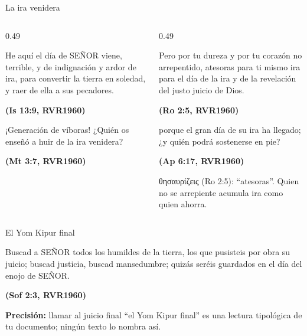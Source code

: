 \documentclass[hyperref={bookmarks=false},aspectratio=169]{beamer}
\newcommand{\grc}[1]{\foreignlanguage{ancientgreek}{#1}}
\newcommand{\SENOR}{S{\fontsize{0.78em}{1em}\selectfont EÑOR}}
\newcommand{\fuente}[1]{\par\hfill{\upshape\bfseries\footnotesize\textcolor{azul}{#1}}}
\newcommand{\precision}[1]{{\footnotesize\color{gris}\textbf{Precisión:} #1}}
\begin{document}
\begin{frame}{La ira venidera}
\begin{columns}[t,onlytextwidth]
\begin{column}{0.49\textwidth}
\begin{cita}He aquí el día de \SENOR{} viene, terrible, y de indignación y ardor de ira, para convertir la tierra en soledad, y raer de ella a sus pecadores.\fuente{(Is 13:9, RVR1960)}\end{cita}
\begin{cita}¡Generación de víboras! ¿Quién os enseñó a huir de la ira venidera?\fuente{(Mt 3:7, RVR1960)}\end{cita}
\end{column}
\begin{column}{0.49\textwidth}
\begin{cita}Pero por tu dureza y por tu corazón no arrepentido, atesoras para ti mismo ira para el día de la ira y de la revelación del justo juicio de Dios.\fuente{(Ro 2:5, RVR1960)}\end{cita}
\begin{cita}porque el gran día de su ira ha llegado; ¿y quién podrá sostenerse en pie?\fuente{(Ap 6:17, RVR1960)}\end{cita}
\scriptsize\grc{θησαυρίζεις} (Ro 2:5): ``atesoras''. Quien no se arrepiente acumula ira como quien ahorra.
\end{column}
\end{columns}
\end{frame}

\begin{frame}{El Yom Kipur final}
\centering
{}\par\medskip
\begin{cita}Buscad a \SENOR{} todos los humildes de la tierra, los que pusisteis por obra su juicio; buscad justicia, buscad mansedumbre; quizás seréis guardados en el día del enojo de \SENOR.\fuente{(Sof 2:3, RVR1960)}\end{cita}
\precision{llamar al juicio final ``el Yom Kipur final'' es una lectura tipológica de tu documento; ningún texto lo nombra así.}
\end{frame}
\end{document}
